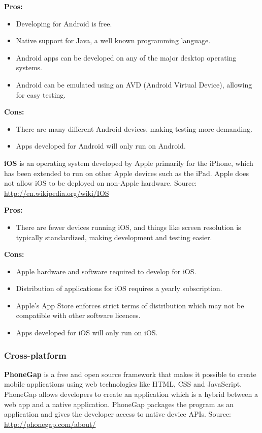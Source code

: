\indent
  {\bf Pros:}
  \begin{itemize}
    \item Developing for Android is free.
    \item Native support for Java, a well known programming language.
    \item Android apps can be developed on any of the major desktop operating
          systems.
    \item Android can be emulated using an AVD (Android Virtual Device),
          allowing for easy testing.
  \end{itemize}

\indent
  {\bf Cons:}
  \begin{itemize}
    \item There are many different Android devices, making testing more
          demanding.
    \item Apps developed for Android will only run on Android.
  \end{itemize}

\noindent
{\bf iOS} is an operating system developed by Apple primarily for the iPhone,
which has been extended to run on other Apple devices such as the iPad. Apple
does not allow iOS to be deployed on non-Apple hardware.
Source: \url{http://en.wikipedia.org/wiki/IOS}

\indent
  {\bf Pros:}
  \begin{itemize}
    \item There are fewer devices running iOS, and things like screen
          resolution is typically standardized, making development and testing
          easier.
  \end{itemize}

\indent
  {\bf Cons:}
  \begin{itemize}
    \item Apple hardware and software required to develop for iOS.
    \item Distribution of applications for iOS requires a yearly subscription.
    \item Apple's App Store enforces strict terms of distribution which may not
          be compatible with other software licences.
    \item Apps developed for iOS will only run on iOS.
  \end{itemize}


\subsubsection{Cross-platform}
{\bf PhoneGap} is a free and open source framework that makes it possible
to create mobile applications using web technologies like HTML, CSS and
JavaScript. PhoneGap allows developers to create an application which is a
hybrid between a web app and a native application. PhoneGap packages the
program as an application and gives the developer access to native device APIs.
Source: \url{http://phonegap.com/about/}

